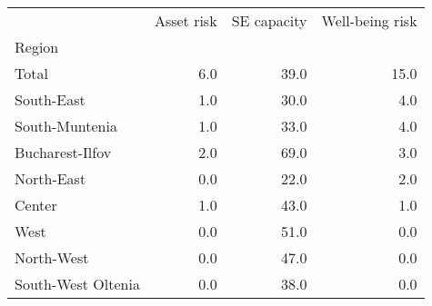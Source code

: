 \begin{tabular}{lrrr}
\toprule
{} &  Asset risk &  SE capacity &  Well-being risk \\
Region             &             &              &                  \\
\midrule
Total              &         6.0 &         39.0 &             15.0 \\
South-East         &         1.0 &         30.0 &              4.0 \\
South-Muntenia     &         1.0 &         33.0 &              4.0 \\
Bucharest-Ilfov    &         2.0 &         69.0 &              3.0 \\
North-East         &         0.0 &         22.0 &              2.0 \\
Center             &         1.0 &         43.0 &              1.0 \\
West               &         0.0 &         51.0 &              0.0 \\
North-West         &         0.0 &         47.0 &              0.0 \\
South-West Oltenia &         0.0 &         38.0 &              0.0 \\
\bottomrule
\end{tabular}
